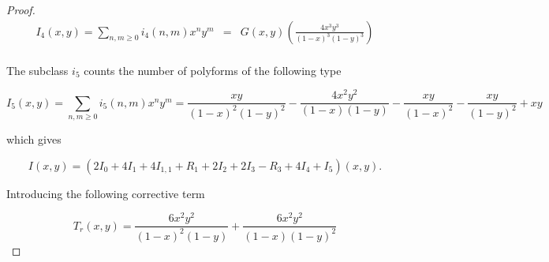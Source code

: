 \documentclass[12pt]{article}
\theoremstyle{plain}
\theoremstyle{definition}
\theoremstyle{remark}
\theoremstyle{definition}
\newcommand{\cellw}[4]{\draw[thick] ( #1 , #2 ) rectangle ( #3 , #4 );}
\newcommand{\cellb}[4]{\filldraw[black!60] ( #1 , #2 ) rectangle ( #3 , #4 ); \draw[thick] ( #1 , #2 ) rectangle ( #3 , #4 );}
\begin{document}
\begin{proof}
\begin{eqnarray*}
    I_4(x,y) = \sum_{n,m \geq 0}i_4(n,m)x^n y^m & = & G(x,y)\left(\frac{4x^3 y^3}{(1-x)^3 (1-y)^3}\right) \\ 
\end{eqnarray*}

The subclass $i_5$ counts the number of polyforms of the following type

\begin{center}
\end{center}

\begin{equation*}
    I_5(x,y) = \sum_{n,m \geq 0} i_5(n,m) x^n y^m = \frac{xy}{(1-x)^2 (1-y)^2} - \frac{4x^2 y^2}{(1-x) (1-y)} - \frac{xy}{(1-x)^2} - \frac{xy}{(1-y)^2} + xy
\end{equation*}

which gives 

\begin{equation*}
    I(x,y) = (2I_0 + 4I_1 + 4I_{1,1} + R_1 + 2I_2 + 2I_3 - R_3 + 4I_4 + I_5)(x,y).
\end{equation*}

Introducing the following corrective term

\begin{equation*}
    T_r(x,y) = \frac{6x^2 y^2}{(1-x)^2 (1-y)} + \frac{6x^2 y^2}{(1-x) (1-y)^2}
\end{equation*}


\end{proof}
\end{document}
